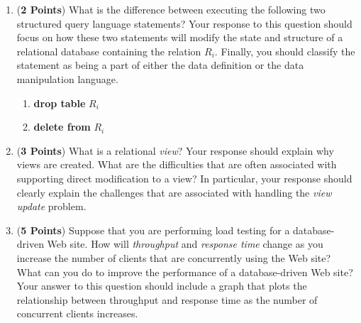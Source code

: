 \documentclass[12pt]{article}
\begin{document}
\begin{enumerate}
\begin{enumerate}
  \item ({\bf 2 Points}) What is the difference between executing the
    following two structured query language statements?  Your response
    to this question should focus on how these two statements will
    modify the state and structure of a relational database containing
    the relation $R_i$.  Finally, you should classify the statement as
    being a part of either the data definition or the data
    manipulation language.

    \begin{enumerate}

    \item {\bf drop table} $R_i$

    \item {\bf delete from} $R_i$

    \end{enumerate}

  \item ({\bf 3 Points}) What is a relational {\em view}?  Your
    response should explain why views are created.  What are the
    difficulties that are often associated with supporting direct
    modification to a view?  In particular, your response should
    clearly explain the challenges that are associated with handling
    the {\em view update} problem.
    



    \item ({\bf 5 Points}) Suppose that you are performing load
      testing for a database-driven Web site.  How will {\em
        throughput} and {\em response time} change as you increase the
      number of clients that are concurrently using the Web site?
      What can you do to improve the performance of a database-driven
      Web site?  Your answer to this question should include a graph
      that plots the relationship between throughput and response time
      as the number of concurrent clients increases.


\end{enumerate}
\end{enumerate}
\end{document}
